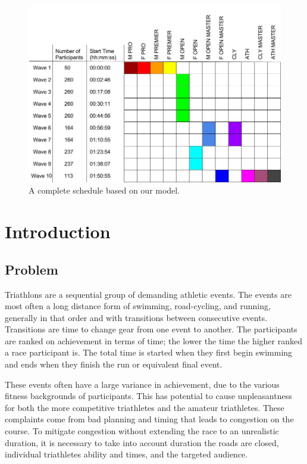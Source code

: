 \documentclass[12pt]{article}
\begin{document}
\clearpage
\begin{figure}[H]
  \centering
  \includegraphics[width=1\textwidth]{Diagram.jpg}
  \caption{A complete schedule based on our model.}
\end{figure}
\clearpage

\clearpage
\tableofcontents
\clearpage
\section{Introduction}
\subsection{Problem}
Triathlons are a sequential group of demanding athletic events. The events are most often a long distance form of swimming, road-cycling, and running, generally in that order and with transitions between consecutive events. Transitions are time to change gear from one event to another. The participants are ranked on achievement in terms of time; the lower the time the higher ranked a race participant is. The total time is started when they first begin swimming and ends when they finish the run or equivalent final event.\par{}
These events often have a large variance in achievement, due to the various fitness backgrounds of participants. This has potential to cause unpleasantness for both the more competitive triathletes and the amateur triathletes. These complaints come from bad planning and timing that leads to congestion on the course. To mitigate congestion without extending the race to an unrealistic duration, it is necessary to take into account duration the roads are closed, individual triathletes ability and times, and the targeted audience.
\end{document}
